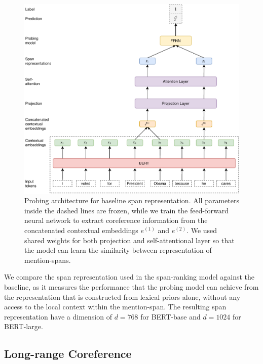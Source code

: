 \documentclass[11pt]{article}
\begin{document}
\begin{figure}[ht]
  \includegraphics[width=\textwidth]{baseline_span}
  \caption{Probing architecture for baseline span representation. All parameters inside the dashed lines are frozen, while we train the feed-forward neural network to extract coreference information from the concatenated contextual embeddings $e^{(1)}$ and $e^{(2)}$. We used shared weights for both projection and self-attentional layer so that the model can learn the similarity between representation of mention-spans.}
  \label{fig:baseline} 
\end{figure}

We compare the span representation used in the span-ranking model against the baseline, as it measures the performance that the probing model can achieve from the representation that is constructed from lexical priors alone, without any access to the local context within the mention-span. The resulting span representation have a dimension of $d = 768$ for BERT-base and $d = 1024$ for BERT-large.

\pagebreak %
\subsection{Long-range Coreference}
\end{document}
